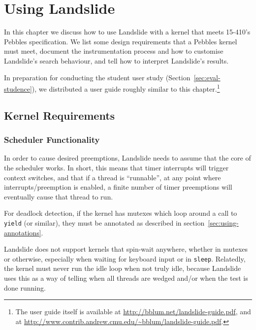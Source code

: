 \chapter{Using Landslide}
\label{sec:using}

In this chapter we discuss how to use Landslide with a kernel that meets 15-410's Pebbles specification. We list some design requirements that a Pebbles kernel must meet, document the instrumentation process and how to customise Landslide's search behaviour, and tell how to interpret Landslide's results.

In preparation for conducting the student user study (Section~\ref{sec:eval-studence}), we distributed a user guide roughly similar to this chapter.\footnote{
The user guide itself is available at \url{http://bblum.net/landslide-guide.pdf}, and at \url{http://www.contrib.andrew.cmu.edu/~bblum/landslide-guide.pdf}.}

\section{Kernel Requirements}
\label{sec:using-requirements}

\subsection{Scheduler Functionality}
\label{sec:using-requirements-sched}

In order to cause desired preemptions, Landslide needs to assume that the core of the scheduler works. In short, this means that timer interrupts will trigger context switches, and that if a thread is ``runnable'', at any point where interrupts/preemption is enabled, a finite number of timer preemptions will eventually cause that thread to run.

For deadlock detection, if the kernel has mutexes which loop around a call to \texttt{yield} (or similar), they must be annotated as described in section~\ref{sec:using-annotations}. 

Landslide does not support kernels that spin-wait anywhere, whether in mutexes or otherwise, especially when waiting for keyboard input or in \texttt{sleep}. Relatedly, the kernel must never run the idle loop when not truly idle, because Landslide uses this as a way of telling when all threads are wedged and/or when the test is done running.


